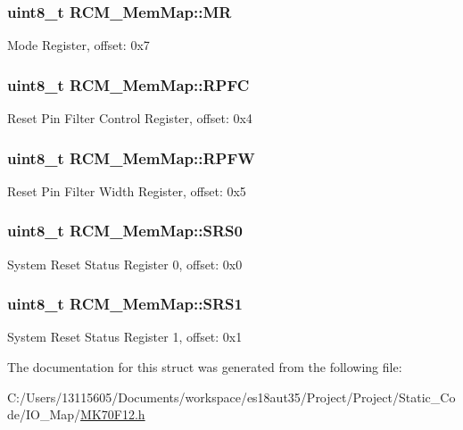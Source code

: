 \subsubsection[{M\+R}]{\setlength{\rightskip}{0pt plus 5cm}uint8\+\_\+t R\+C\+M\+\_\+\+Mem\+Map\+::\+M\+R}\label{struct_r_c_m___mem_map_a0e7b707ffc94ef2a3c49a5ca51acc6c9}
Mode Register, offset\+: 0x7 \hypertarget{struct_r_c_m___mem_map_ace89c039f8342f8b5dd26c3c7b8309a2}{}
\subsubsection[{R\+P\+F\+C}]{\setlength{\rightskip}{0pt plus 5cm}uint8\+\_\+t R\+C\+M\+\_\+\+Mem\+Map\+::\+R\+P\+F\+C}\label{struct_r_c_m___mem_map_ace89c039f8342f8b5dd26c3c7b8309a2}
Reset Pin Filter Control Register, offset\+: 0x4 \hypertarget{struct_r_c_m___mem_map_ac458f95f6aa234285f568694a5b8240d}{}
\subsubsection[{R\+P\+F\+W}]{\setlength{\rightskip}{0pt plus 5cm}uint8\+\_\+t R\+C\+M\+\_\+\+Mem\+Map\+::\+R\+P\+F\+W}\label{struct_r_c_m___mem_map_ac458f95f6aa234285f568694a5b8240d}
Reset Pin Filter Width Register, offset\+: 0x5 \hypertarget{struct_r_c_m___mem_map_aa28b91bdb2e1acc454f7bcb9ad26efb7}{}
\subsubsection[{S\+R\+S0}]{\setlength{\rightskip}{0pt plus 5cm}uint8\+\_\+t R\+C\+M\+\_\+\+Mem\+Map\+::\+S\+R\+S0}\label{struct_r_c_m___mem_map_aa28b91bdb2e1acc454f7bcb9ad26efb7}
System Reset Status Register 0, offset\+: 0x0 \hypertarget{struct_r_c_m___mem_map_a8e7926e6f51e64e63e5ed3adb7aee612}{}
\subsubsection[{S\+R\+S1}]{\setlength{\rightskip}{0pt plus 5cm}uint8\+\_\+t R\+C\+M\+\_\+\+Mem\+Map\+::\+S\+R\+S1}\label{struct_r_c_m___mem_map_a8e7926e6f51e64e63e5ed3adb7aee612}
System Reset Status Register 1, offset\+: 0x1 

The documentation for this struct was generated from the following file\+:\begin{DoxyCompactItemize}
\item 
C\+:/\+Users/13115605/\+Documents/workspace/es18aut35/\+Project/\+Project/\+Static\+\_\+\+Code/\+I\+O\+\_\+\+Map/\hyperlink{_m_k70_f12_8h}{M\+K70\+F12.\+h}\end{DoxyCompactItemize}
